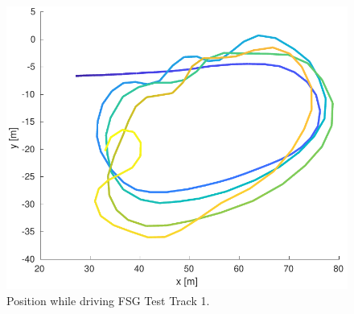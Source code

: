 \begin{figure}
    \centering
    \includegraphics[width=0.8\linewidth]{0_Images/6_Results/positionFSGTestTrack.pdf}
    \caption[Position while driving FSG Test Track 1.]
    {Position while driving FSG Test Track 1.}
    \label{Fig:PosFSGTestTrack}
\end{figure}

\FloatBarrier